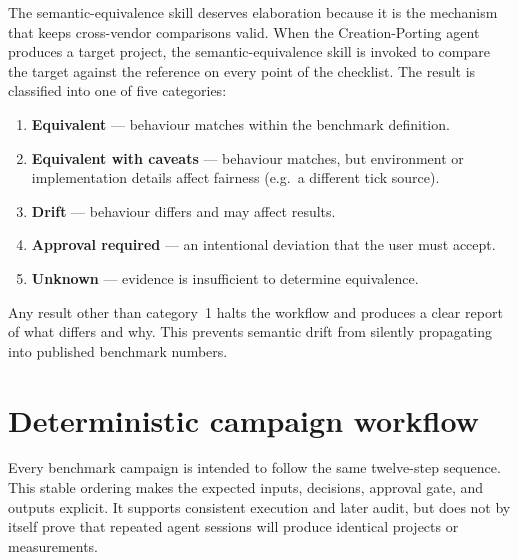 The semantic-equivalence skill deserves elaboration because it is the mechanism that keeps
cross-vendor comparisons valid. When the Creation-Porting agent produces a target project,
the semantic-equivalence skill is invoked to compare the target against the reference on
every point of the checklist. The result is classified into one of five categories:

\begin{enumerate}
\item \textbf{Equivalent} --- behaviour matches within the benchmark definition.
\item \textbf{Equivalent with caveats} --- behaviour matches, but environment or
implementation details affect fairness (e.g.\ a different tick source).
\item \textbf{Drift} --- behaviour differs and may affect results.
\item \textbf{Approval required} --- an intentional deviation that the user must accept.
\item \textbf{Unknown} --- evidence is insufficient to determine equivalence.
\end{enumerate}

Any result other than category~1 halts the workflow and produces a clear report of what
differs and why. This prevents semantic drift from silently propagating into published
benchmark numbers.

\section{Deterministic campaign workflow}
\label{sec:agent-workflow}

Every benchmark campaign is intended to follow the same twelve-step sequence. This stable
ordering makes the expected inputs, decisions, approval gate, and outputs explicit. It
supports consistent execution and later audit, but does not by itself prove that repeated
agent sessions will produce identical projects or measurements.

